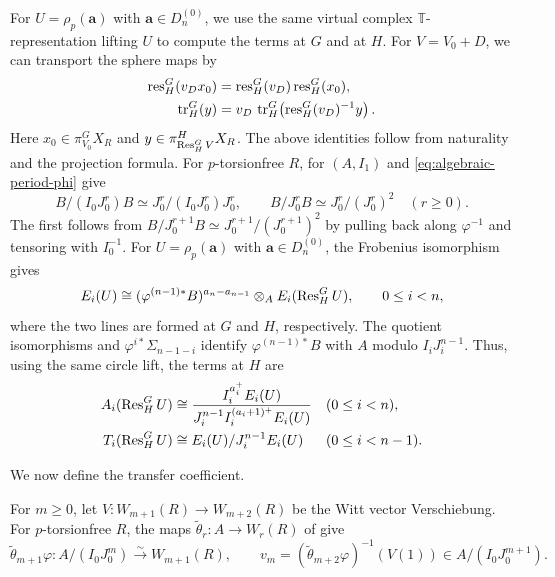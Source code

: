 For $U=\rho_p(\mathbf a)$ with $\mathbf a\in D_n^{(0)}$, we use the same virtual complex
$\mathbb T$-representation lifting $U$ to compute the terms at
$G$ and at $H$.
For $V=V_0+D$, we can transport the sphere maps by
\begin{equation}\label{eq:character-res-tr}
\begin{aligned}
\operatorname{res}_H^G(v_Dx_0)
 &=\operatorname{res}_H^G(v_D)\operatorname{res}_H^G(x_0),\\
\operatorname{tr}_H^G(y)
 &=v_D\,\operatorname{tr}_H^G\!\left(\operatorname{res}_H^G(v_D)^{-1}y\right).
\end{aligned}
\end{equation}
Here $x_0\in\pi_{V_0}^G X_R$ and
$y\in\pi_{\operatorname{Res}_H^G V}^H X_R$.
The above identities follow from naturality and the projection formula.
For $p$-torsionfree $R$, \cite[Proposition~2.2.12]{BhattLurie}
for $(A,I_1)$ and \eqref{eq:algebraic-period-phi} give
\[
 B/(I_0J_0^r)B\simeq J_0^r/(I_0J_0^r)J_0^r,\qquad
 B/J_0^rB\simeq J_0^r/(J_0^r)^2\quad(r\ge0).
\]
The first follows from $B/J_0^{r+1}B\simeq J_0^{r+1}/(J_0^{r+1})^2$
by pulling back along $\varphi^{-1}$ and tensoring with $I_0^{-1}$.
For $U=\rho_p(\mathbf a)$ with $\mathbf a\in D_n^{(0)}$, the Frobenius isomorphism gives
\[
E_i(U)\cong
(\varphi^{(n-1)*}B)^{a_n-a_{n-1}}\otimes_A E_i(\operatorname{Res}_H^G U),
\qquad 0\le i<n,
\]
where the two lines are formed at $G$ and $H$, respectively.
The quotient isomorphisms and $\varphi^{i*}\Sigma_{n-1-i}$ identify
$\varphi^{(n-1)*}B$ with $A$ modulo $I_iJ_i^{n-1}$.
Thus, using the same circle lift, the terms at $H$ are
\begin{equation}\label{eq:subgroup-coefficients}
\begin{aligned}
A_i(\operatorname{Res}_H^G U)&\cong
\frac{I_i^{a_i^+}E_i(U)}
     {J_i^{n-1}I_i^{(a_i+1)^+}E_i(U)}
&& (0\le i<n),\\
T_i(\operatorname{Res}_H^G U)&\cong E_i(U)/J_i^{n-1}E_i(U)
&& (0\le i<n-1).
\end{aligned}
\end{equation}

We now define the transfer coefficient.

\begin{definition}\label{def:transfer-coefficient}
For $m\ge0$, let
$V:W_{m+1}(R)\to W_{m+2}(R)$
be the Witt vector Verschiebung.
For $p$-torsionfree $R$, the maps
$\widetilde\theta_r:A\to W_r(R)$
of \cite[Lemma~3.12]{BMS18} give
\[
\widetilde\theta_{m+1}\varphi:
A/(I_0J_0^m)\xrightarrow{\sim}W_{m+1}(R),
\qquad
v_m=(\widetilde\theta_{m+2}\varphi)^{-1}(V(1))
\in A/(I_0J_0^{m+1}).
\]
\end{definition}

